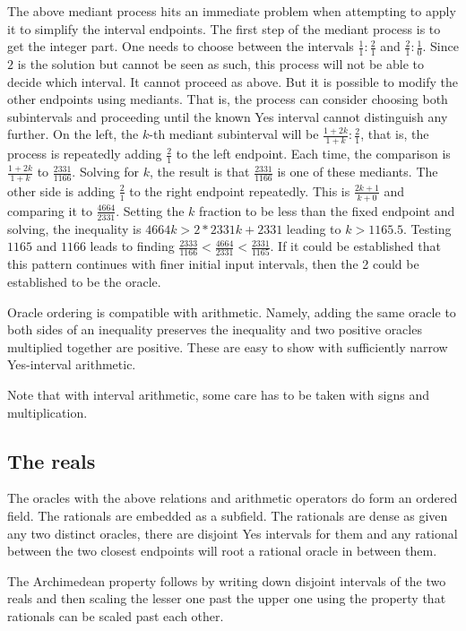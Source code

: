 \documentclass[12pt]{article}
\theoremstyle{remark}
\begin{document}
The above mediant process hits an immediate problem when attempting to apply it to simplify the interval endpoints. The first step of the mediant process is to get the integer part. One needs to choose between the intervals $\frac{1}{1}:\frac{2}{1}$ and $\frac{2}{1}:\frac{1}{0}$. Since $2$ is the solution but cannot be seen as such, this process will not be able to decide which interval. It cannot proceed as above. But it is possible to modify the other endpoints using mediants. That is, the process can consider choosing both subintervals and proceeding until the known Yes interval cannot distinguish any further. On the left, the $k$-th mediant subinterval will be $\frac{1 + 2k}{1+k}:\frac{2}{1}$, that is, the process is repeatedly adding $\frac{2}{1}$ to the left endpoint. Each time, the comparison is $\frac{1+2k}{1+k}$ to $\frac{2331}{1166}$. Solving for $k$, the result is that $\frac{2331}{1166}$ is one of these mediants. The other side is adding $\frac{2}{1}$ to the right endpoint repeatedly. This is $\frac{2k + 1}{k+0}$ and comparing it to $\frac{4664}{2331}$. Setting the $k$ fraction to be less than the fixed endpoint and solving, the inequality is $4664k > 2*2331 k + 2331$ leading to $k > 1165.5$. Testing $1165$ and $1166$ leads to finding $\frac{2333}{1166} < \frac{4664}{2331} < \frac{2331}{1165}$. If it could be established that this pattern continues with finer initial input intervals, then the 2 could be established to be the oracle. 

Oracle ordering is compatible with arithmetic. Namely, adding the same oracle to both sides of an inequality preserves the inequality and two positive oracles multiplied together are positive. These are easy to show with sufficiently narrow Yes-interval arithmetic. 

Note that with interval arithmetic, some care has to be taken with signs and multiplication. 

\subsection{The reals}

The oracles with the above relations and arithmetic operators do form an ordered field. The rationals are embedded as a subfield. The rationals are dense as given any two distinct oracles, there are disjoint Yes intervals for them and any rational between the two closest endpoints will root a rational oracle in between them. 

The Archimedean property follows by  writing down disjoint intervals of the two reals and then scaling the lesser one past the upper one using the property that rationals can be scaled past each other. 
\end{document}
